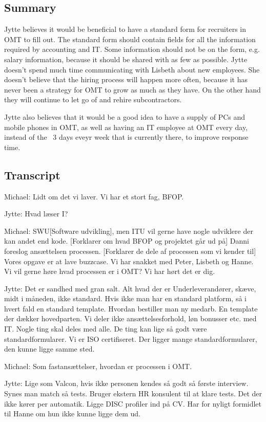 \begin{linenumbers*}
\subsection{Summary}
Jytte believes it would be beneficial to have a standard form for recruiters in OMT to fill out.
The standard form should contain fields for all the information required by accounting and IT.
Some information should not be on the form, e.g. salary information, because it should be shared with as few as possible.
Jytte doesn't spend much time communicating with Lisbeth about new employees.
She doesn't believe that the hiring process will happen more often, because it has never been a strategy for OMT to grow as much as they have.
On the other hand they will continue to let go of and rehire subcontractors.

Jytte also believes that it would be a good idea to have a supply of PCs and mobile phones in OMT, as well as having an IT employee at OMT every day, instead of the ~3 days eveyr week that is currently there, to improve response time.

\subsection{Transcript}
Michael:
Lidt om det vi laver. Vi har et stort fag, BFOP.

Jytte:
Hvad læser I?

Michael:
SWU[Software udvikling], men ITU vil gerne have nogle udviklere
der kan andet end kode.
[Forklarer om hvad BFOP og projektet går ud på]
Danni foreslog ansættelsen processen. 
[Forklarer de dele af processen som vi kender til]
Vores opgave er at lave buzzcase. Vi har snakket med Peter,
Lisbeth og Hanne. Vi vil gerne høre hvad processen er i OMT?
Vi har hørt det er dig.

Jytte:
Det er sandhed med gran salt. Alt hvad der er
Underleverandører, skæve, midt i måneden, ikke standard.
Hvis ikke man har en standard platform, så i hvert fald
en standard template. 
Hvordan bestiller man ny medarb. En template der dækker hovedparten.
Vi deler ikke ansættelsesforhold, løn bonusser etc. med IT.
Nogle ting skal deles med alle. De ting kan lige så godt være
standardformularer.
Vi er ISO certifiseret. Der ligger mange standardformularer,
den kunne ligge samme sted.

Michael:
Som fastansættelser, hvordan er processen i OMT.

Jytte:
Lige som Valcon, hvis ikke personen kendes så godt så første interview. 
Synes man match så tests. Bruger ekstern HR konsulent til at klare tests.
Det der ikke kører per automatik. Ligge DISC profiler ind på CV. 
Har for nyligt formidlet til Hanne om hun ikke kunne ligge dem ud.


\end{linenumbers*}
